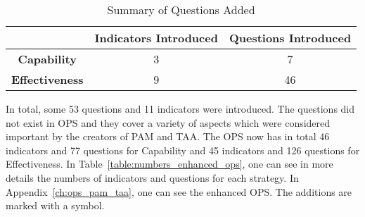 \begin{table} [H]
	\caption{Summary of Questions Added}
	\label{table:summary_questions_added}
	\begin{tabular}{| c | c | c |} \hline
		 & \textbf{Indicators Introduced} & \textbf{Questions Introduced} \\ \hline
		 \textbf{Capability} & 3 & 7 \\ \hline
		 \textbf{Effectiveness} & 9 & 46 \\ \hline
	\end{tabular}
\end{table}

In total, some 53 questions and 11 indicators were introduced. The questions did not exist in OPS and they cover a variety of aspects which were considered important by the creators of PAM and TAA. The OPS now has in total 46 indicators and 77 questions for Capability and 45 indicators and 126 questions for Effectiveness. In Table~\ref{table:numbers_enhanced_ops}, one can see in more details the numbers of indicators and questions for each strategy. In Appendix~\ref{ch:ops_pam_taa}, one can see the enhanced OPS. The additions are marked with a \FiveStar  symbol.


